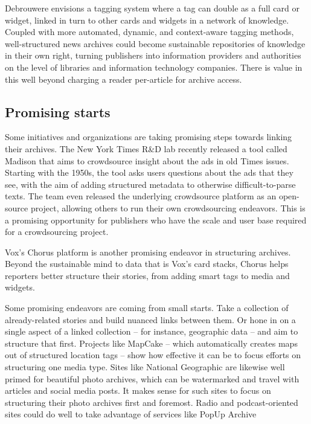 Debrouwere envisions a tagging system where a tag can double as a full card or widget, linked in turn to other cards and widgets in a network of knowledge. Coupled with more automated, dynamic, and context-aware tagging methods, well-structured news archives could become sustainable repositories of knowledge in their own right, turning publishers into information providers and authorities on the level of libraries and information technology companies. There is value in this well beyond charging a reader per-article for archive access.

\subsection{Promising starts}

Some initiatives and organizations are taking promising steps towards linking their archives. The New York Times R\&D lab recently released a tool called Madison that aims to crowdsource insight about the ads in old Times issues. Starting with the 1950s, the tool asks users questions about the ads that they see, with the aim of adding structured metadata to otherwise difficult-to-parse texts. The team even released the underlying crowdsource platform as an open-source project, allowing others to run their own crowdsourcing endeavors. This is a promising opportunity for publishers who have the scale and user base required for a crowdsourcing project.


Vox's Chorus platform is another promising endeavor in structuring archives. Beyond the sustainable mind to data that is Vox's card stacks, Chorus helps reporters better structure their stories, from adding smart tags to media and widgets.


Some promising endeavors are coming from small starts. Take a collection of already-related stories and build nuanced links between them. Or hone in on a single aspect of a linked collection -- for instance, geographic data -- and aim to structure that first. Projects like MapCake -- which automatically creates maps out of structured location tags -- show how effective it can be to focus efforts on structuring one media type. Sites like National Geographic are likewise well primed for beautiful photo archives, which can be watermarked and travel with articles and social media posts. It makes sense for such sites to focus on structuring their photo archives first and foremost. Radio and podcast-oriented sites could do well to take advantage of services like PopUp Archive

